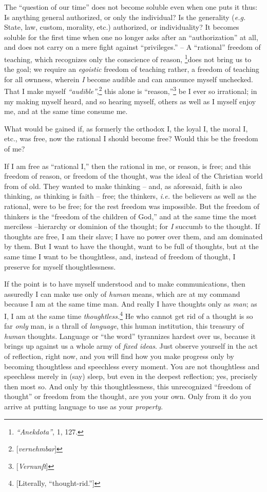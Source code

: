 \documentclass[12pt,a4paper]{book}
\begin{document}
The ``question of our time'' does not become soluble even when one puts it 
thus: Is anything general authorized, or only the individual? Is the 
generality (\textit{e.g.} State, law, custom, morality, etc.) authorized, or 
individuality? It becomes soluble for the first time when one no longer asks 
after an ``authorization'' at all, and does not carry on a mere fight 
against ``privileges.'' -- A ``rational'' freedom of teaching, which 
recognizes only the conscience of reason, \footnote{\textit{``Anekdota''}, 
1, 127. }does not bring us to the goal; we require an \textit{egoistic} 
freedom of teaching rather, a freedom of teaching for all ownness, wherein 
\textit{I} become audible and can announce myself unchecked. That I make 
myself \textit{``audible''},\footnote{[\textit{vernehmbar}]} this alone is 
``reason,''\footnote{[\textit{Vernunft}]} be I ever so irrational; in my 
making myself heard, and so hearing myself, others as well as I myself enjoy 
me, and at the same time consume me.

What would be gained if, as formerly the orthodox I, the loyal I, the moral I, 
etc., was free, now the rational I should become free? Would this be the 
freedom of me?

If I am free as ``rational I,'' then the rational in me, or reason, is free; 
and this freedom of reason, or freedom of the thought, was the ideal of the 
Christian world from of old. They wanted to make thinking -- and, as 
aforesaid, faith is also thinking, as thinking is faith -- free; the thinkers, 
\textit{i.e.} the believers as well as the rational, were to be free; for the 
rest freedom was impossible. But the freedom of thinkers is the ``freedom of 
the children of God,'' and at the same time the most merciless --hierarchy or 
dominion of the thought; for \textit{I} succumb to the thought. If thoughts 
are free, I am their slave; I have no power over them, and am dominated by 
them. But I want to have the thought, want to be full of thoughts, but at the 
same time I want to be thoughtless, and, instead of freedom of thought, I 
preserve for myself thoughtlessness.

If the point is to have myself understood and to make communications, then 
assuredly I can make use only of \textit{human} means, which are at my command 
because I am at the same time man. And really I have thoughts only as 
\textit{man}; as I, I am at the same time 
\textit{thoughtless.}\footnote{[Literally, ``thought-rid.'']} He who cannot 
get rid of a thought is so far \textit{only} man, is a thrall of 
\textit{language}, this human institution, this treasury of \textit{human} 
thoughts. Language or ``the word'' tyrannizes hardest over us, because it 
brings up against us a whole army of \textit{fixed ideas}. Just observe 
yourself in the act of reflection, right now, and you will find how you make 
progress only by becoming thoughtless and speechless every moment. You are not 
thoughtless and speechless merely in (say) sleep, but even in the deepest 
reflection; yes, precisely then most so. And only by this thoughtlessness, 
this unrecognized ``freedom of thought'' or freedom from the thought, are 
you your own. Only from it do you arrive at putting language to use as your 
\textit{property}.
\end{document}
